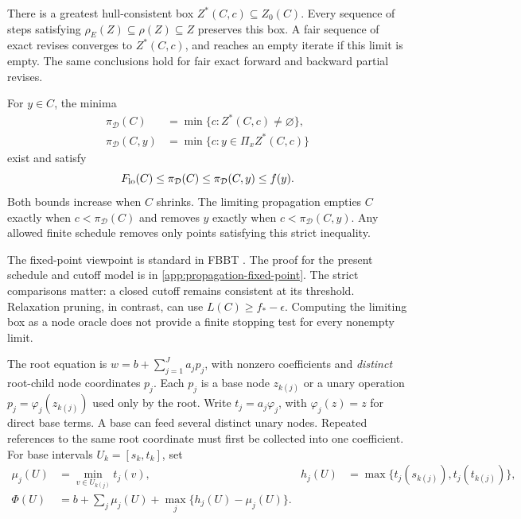 \begin{theorem}
\label{prop:fixed-point}
There is a greatest hull-consistent box $Z^*(C,c)\subseteq Z_0(C)$.
Every sequence of steps satisfying
$\rho_E(Z)\subseteq\rho(Z)\subseteq Z$ preserves this box. A fair sequence
of exact revises converges to $Z^*(C,c)$, and reaches an empty iterate if
this limit is empty. The same conclusions hold for fair exact forward and
backward partial revises.

For $y\in C$, the minima
\begin{align}
 \pi_{\mathcal D}(C)&=\min\{c:Z^*(C,c)\ne\varnothing\},\label{prop:pi-box}\\
 \pi_{\mathcal D}(C,y)&=\min\{c:y\in\Pi_xZ^*(C,c)\}\label{prop:pi-point}
\end{align}
exist and satisfy
\begin{equation}
 F_{\rm lo}(C)\le\pi_{\mathcal D}(C)
 \le\pi_{\mathcal D}(C,y)\le f(y).
 \label{prop:bound-chain}
\end{equation}
Both bounds increase when $C$ shrinks. The limiting propagation empties $C$
exactly when $c<\pi_{\mathcal D}(C)$ and removes $y$ exactly when
$c<\pi_{\mathcal D}(C,y)$. Any allowed finite schedule removes only points
satisfying this strict inequality.
\end{theorem}

The fixed-point viewpoint is standard in FBBT
\citep{belottiCafieriLeeLiberti2012FBBT}. The proof for the present schedule
and cutoff model is in \cref{app:propagation-fixed-point}. The strict comparisons
matter: a closed cutoff remains consistent at its threshold. Relaxation
pruning, in contrast, can use $L(C)\ge f_* -\epsilon$. Computing the limiting
box as a node oracle does not provide a finite stopping test for every
nonempty limit.

\begin{definition}
\label{prop:flat-definition}
The root equation is
$w=b+\sum_{j=1}^J a_jp_j$, with nonzero coefficients and \emph{distinct}
root-child node coordinates $p_j$. Each $p_j$ is a base node $z_{k(j)}$ or
a unary operation $p_j=\varphi_j(z_{k(j)})$ used only by the root. Write
$t_j=a_j\varphi_j$, with $\varphi_j(z)=z$ for direct base terms. A base can
feed several distinct unary nodes. Repeated references to the same root
coordinate must first be collected into one coefficient. For base intervals
$U_k=[s_k,t_k]$, set
\begin{align}
 \mu_j(U)&=\min_{v\in U_{k(j)}}t_j(v),&
 h_j(U)&=\max\{t_j(s_{k(j)}),t_j(t_{k(j)})\},\\
 \Phi(U)&=b+\sum_j\mu_j(U)+\max_j\{h_j(U)-\mu_j(U)\}.
 \label{prop:flat-functional}
\end{align}
\end{definition}

